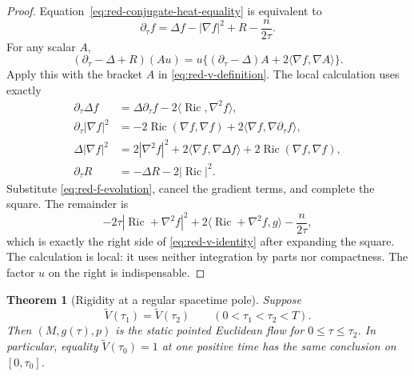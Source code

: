 \documentclass[10pt]{coll-l}
\newtheorem{theorem}{Theorem}[chapter]
\theoremstyle{definition}
\theoremstyle{remark}
\numberwithin{section}{chapter}
\numberwithin{equation}{chapter}
\newcommand{\Ric}{\operatorname{Ric}}
\begin{document}
\begin{proof}
Equation~\eqref{eq:red-conjugate-heat-equality} is equivalent to
\begin{equation}
 \partial_\tau f=\Delta f-|\nabla f|^2+R-\frac n{2\tau}.
                                                               \label{eq:red-f-evolution}
\end{equation}
For any scalar $A$,
\begin{equation}
 (\partial_\tau-\Delta+R)(Au)
 =u\{(\partial_\tau-\Delta)A+2\langle\nabla f,\nabla A\rangle\}.
                                                               \label{eq:red-product-conjugate}
\end{equation}
Apply this with the bracket $A$ in \eqref{eq:red-v-definition}.  The local
calculation uses exactly
\begin{align}
 \partial_\tau\Delta f
   &=\Delta\partial_\tau f-2\langle\Ric,\nabla^2f\rangle,
                                                               \label{eq:red-laplacian-evolution-f}\\
 \partial_\tau|\nabla f|^2
   &=-2\Ric(\nabla f,\nabla f)
       +2\langle\nabla f,\nabla\partial_\tau f\rangle,
                                                               \label{eq:red-gradient-evolution-f}\\
 \Delta|\nabla f|^2
   &=2|\nabla^2f|^2+2\langle\nabla f,\nabla\Delta f\rangle
       +2\Ric(\nabla f,\nabla f),                       \label{eq:red-Bochner-f}\\
 \partial_\tau R&=-\Delta R-2|\Ric|^2.                 \label{eq:red-scalar-backward-repeat}
\end{align}
Substitute \eqref{eq:red-f-evolution}, cancel the gradient terms, and
complete the square.  The remainder is
\begin{equation}
 -2\tau|\Ric+\nabla^2f|^2
 +2\langle\Ric+\nabla^2f,g\rangle-\frac n{2\tau},       \label{eq:red-v-pre-square}
\end{equation}
which is exactly the right side of \eqref{eq:red-v-identity} after expanding
the square.  The calculation is local: it uses neither integration by parts
nor compactness.  The factor $u$ on the right is indispensable.
\end{proof}

\begin{theorem}[Rigidity at a regular spacetime pole]
\label{thm:red-regular-pole-rigidity}
Suppose
\begin{equation}
          \widetilde V(\tau_1)=\widetilde V(\tau_2)
          \qquad(0<\tau_1<\tau_2<T).                   \label{eq:red-volume-equality-times}
\end{equation}
Then $(M,g(\tau),p)$ is the static pointed Euclidean flow for
$0\leq\tau\leq\tau_2$.  In particular, equality
$\widetilde V(\tau_0)=1$ at one positive time has the same conclusion on
$[0,\tau_0]$.
\end{theorem}
\end{document}
